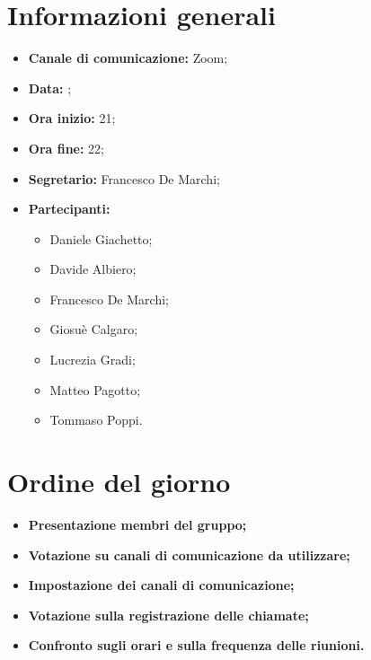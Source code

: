 \section{Informazioni generali}

\begin{itemize}

	\item \textbf{Canale di comunicazione:} Zoom;
	
	\item \textbf{Data:} \DataMeeting{};
	
	\item \textbf{Ora inizio:} 21;
	
	\item \textbf{Ora fine:} 22;
	
	\item \textbf{Segretario:} Francesco De Marchi;
	
	\item \textbf{Partecipanti:}
	
		\begin{itemize}
		
			\item Daniele Giachetto;
			\item Davide Albiero;
			\item Francesco De Marchi;
			\item Giosuè Calgaro;
			\item Lucrezia Gradi;
			\item Matteo Pagotto;
			\item Tommaso Poppi.
				 
		\end{itemize}

\end{itemize}

\section{Ordine del giorno}

\begin{itemize}

	\item\textbf{ Presentazione membri del gruppo;}

	\item\textbf{ Votazione su canali di comunicazione da utilizzare;}

	\item\textbf{ Impostazione dei canali di comunicazione;}

	\item\textbf{ Votazione sulla registrazione delle chiamate;}

	\item\textbf{ Confronto sugli orari e sulla frequenza delle riunioni.}


\end{itemize}
\newpage

